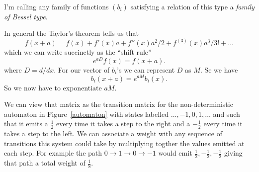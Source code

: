 \documentclass{article}
\begin{document}
I'm calling any family of functions $(b_i)$ satisfying a relation of this type a \textit{family of Bessel type}.

In general the Taylor's theorem tells us that
\[
f(x+a) = f(x)+f'(x)a+f''(x)a^2/2+f^{(3)}(x)a^3/3!+\ldots
\]
which we can write succinctly as the ``shift rule''
\[
e^{aD}f(x) = f(x+a).
\]
where $D=d/dx$.
For our vector of $b_i$'s we can represent $D$ as $M$.
Se we have
\[
b_i(x+a) = e^{aM}b_i(x).
\]
So we now have to exponentiate $aM$.

We can view that matrix as the transition matrix for the non-deterministic automaton in Figure~\ref{automaton} with states labelled $\ldots, -1, 0, 1, \ldots$ and such that it emits a $\frac{1}{2}$ every time it takes a step to the right and a $-\frac{1}{2}$ every time it takes a step to the left. We can associate a weight with any sequence of transitions this system could take by multiplying togther the values emitted at each step. For example the path $0\rightarrow 1\rightarrow 0\rightarrow -1$ would emit $\frac{1}{2},-\frac{1}{2},-\frac{1}{2}$ giving that path a total weight of $\frac{1}{8}$.
\end{document}
